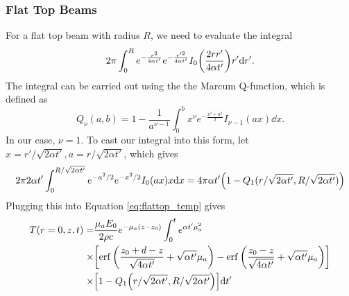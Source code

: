 \documentclass[]{article}
\begin{document}
\subsubsection{Flat Top Beams}
For a flat top beam with radius $R$, we need to evaluate the integral
\begin{equation*}
  2\pi \int_0^R  e^{-\frac{r^2}{4\alpha t'}}e^{-\frac{r'^2}{4\alpha t'}}I_0\qty(\frac{2rr'}{4\alpha t'}) r'\dd r'.
\end{equation*}
The integral can be carried out using the the Marcum Q-function, which is defined as
\begin{equation*}
Q_\nu(a,b) = 1 - \frac{1}{a^{\nu-1}}\int_0^b x^\nu e^{-\frac{x^2 + a^2}{2}} I_{\nu-1}(ax) \dd x.
\end{equation*}
In our case, $\nu=1$.
To cast our integral into this form, let $x = r'/\sqrt{2\alpha t'}, a = r/\sqrt{2\alpha t'}$, which gives
\begin{equation*}
  2\pi 2\alpha t' \int_0^{R/\sqrt{2\alpha t'}} e^{-a^2/2}e^{-x^2/2}I_0\qty(ax) x\dd x= 4\pi\alpha t' \qty(1 - Q_1(r/\sqrt{2\alpha t'},R/\sqrt{2\alpha t'}))
\end{equation*}
Plugging this into Equation \ref{eq:flattop_temp} gives
\begin{align}
  \label{eq:flattop_off_axis_temp}
  T(r=0, z,t) =& \frac{\mu_aE_0}{2\rho c}e^{-\mu_a (z-z_0)} \int_0^t e^{\alpha t'\mu_a^2}  \nonumber \\
  \times & \qty[\erf\qty(\frac{z_0 + d - z}{\sqrt{4\alpha t'}} + \sqrt{\alpha t'}\mu_a ) - \erf\qty(\frac{z_0 - z}{\sqrt{4\alpha t'}} + \sqrt{\alpha t'}\mu_a ) ] \nonumber \\
  \times & \qty[1 - Q_1\qty(r/\sqrt{2\alpha t'},R/\sqrt{2\alpha t'}) ]
  \dd t'
\end{align}
\end{document}

